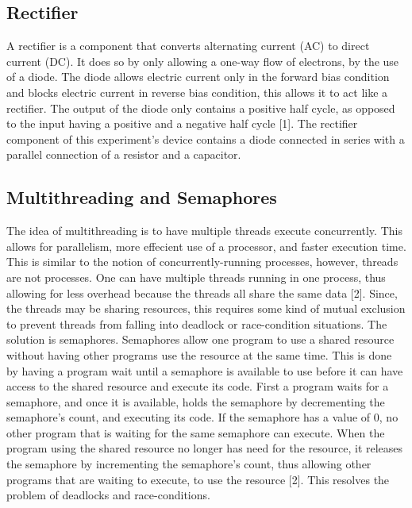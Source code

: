 \documentclass[12pt]{report}
\begin{document}
\subsection{Rectifier}
A rectifier is a component that converts alternating current (AC) to direct current (DC). It does so by only allowing a one-way flow of electrons, by the use of a diode. The diode allows electric current only in the forward bias condition and blocks electric current in reverse bias condition, this allows it to act like a rectifier. The output of the diode only contains a positive half cycle, as opposed to the input having a positive and a negative half cycle [1]. The rectifier component of this experiment's device contains a diode connected in series with a parallel connection of a resistor and a capacitor.

\subsection{Multithreading and Semaphores}
The idea of multithreading is to have multiple threads execute concurrently. This allows for parallelism, more effecient use of a processor, and faster execution time. This is similar to the notion of concurrently-running processes, however, threads are not processes. One can have multiple threads running in one process, thus allowing for less overhead because the threads all share the same data [2]. Since, the threads may be sharing resources, this requires some kind of mutual exclusion to prevent threads from falling into deadlock or race-condition situations. The solution is semaphores. Semaphores allow one program to use a shared resource without having other programs use the resource at the same time. This is done by having a program wait until a semaphore is available to use before it can have access to the shared resource and execute its code. First a program waits for a semaphore, and once it is available, holds the semaphore by decrementing the semaphore's count, and executing its code. If the semaphore has a value of 0, no other program that is waiting for the same semaphore can execute. When the program using the shared resource no longer has need for the resource, it releases the semaphore by incrementing the semaphore's count, thus allowing other programs that are waiting to execute, to use the resource [2]. This resolves the problem of deadlocks and race-conditions.
\end{document}
